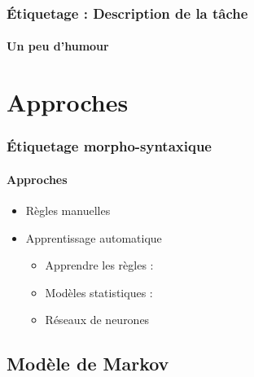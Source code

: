 \documentclass[xcolor=table]{beamer}
\begin{document}
\begin{frame}
\frametitle{Étiquetage : Description de la tâche}
\framesubtitle{Un peu d'humour}

\begin{center}
\end{center}

\end{frame}

\section{Approches}

\begin{frame}
\frametitle{Étiquetage morpho-syntaxique}
\framesubtitle{Approches}

\begin{itemize}
	\item Règles manuelles 
	\item Apprentissage automatique 
	\begin{itemize}
		\item Apprendre les règles : 
		\item Modèles statistiques : 
		\item Réseaux de neurones
	\end{itemize}
\end{itemize}

\end{frame}

\subsection{Modèle de Markov}
\end{document}
